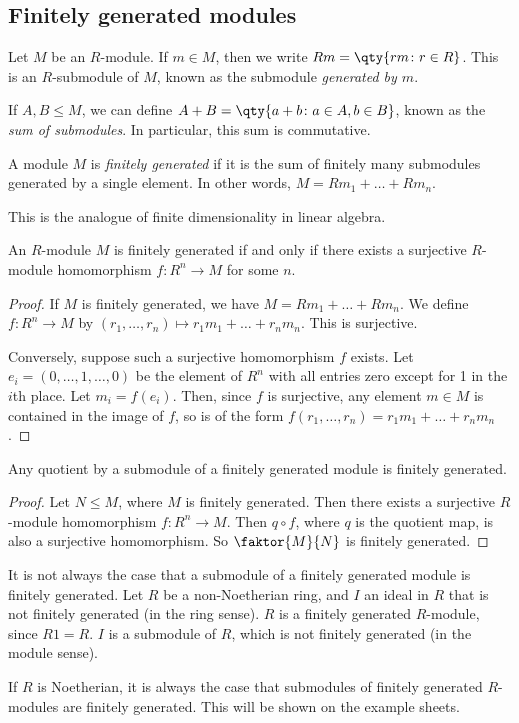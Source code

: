 \subsection{Finitely generated modules}
\begin{definition}
	Let $M$ be an $R$-module.
	If $m \in M$, then we write $Rm = \qty{rm \colon r \in R}$.
	This is an $R$-submodule of $M$, known as the submodule \textit{generated by $m$}.

	If $A, B \leq M$, we can define $A + B = \qty{a + b \colon a \in A, b \in B}$, known as the \textit{sum of submodules}.
	In particular, this sum is commutative.
\end{definition}
\begin{definition}
	A module $M$ is \textit{finitely generated} if it is the sum of finitely many submodules generated by a single element.
	In other words, $M = Rm_1 + \dots + Rm_n$.
\end{definition}
This is the analogue of finite dimensionality in linear algebra.
\begin{lemma}
	An $R$-module $M$ is finitely generated if and only if there exists a surjective $R$-module homomorphism $f \colon R^n \to M$ for some $n$.
\end{lemma}
\begin{proof}
	If $M$ is finitely generated, we have $M = Rm_1 + \dots + Rm_n$.
	We define $f \colon R^n \to M$ by $(r_1, \dots, r_n) \mapsto r_1 m_1 + \dots + r_n m_n$.
	This is surjective.

	Conversely, suppose such a surjective homomorphism $f$ exists.
	Let $e_i = (0, \dots, 1, \dots, 0)$ be the element of $R^n$ with all entries zero except for 1 in the $i$th place.
	Let $m_i = f(e_i)$.
	Then, since $f$ is surjective, any element $m \in M$ is contained in the image of $f$, so is of the form $f(r_1, \dots, r_n) = r_1 m_1 + \dots + r_n m_n$.
\end{proof}
\begin{corollary}
	Any quotient by a submodule of a finitely generated module is finitely generated.
\end{corollary}
\begin{proof}
	Let $N \leq M$, where $M$ is finitely generated.
	Then there exists a surjective $R$-module homomorphism $f \colon R^n \to M$.
	Then $q \circ f$, where $q$ is the quotient map, is also a surjective homomorphism.
	So $\faktor{M}{N}$ is finitely generated.
\end{proof}
\begin{example}
	It is not always the case that a submodule of a finitely generated module is finitely generated.
	Let $R$ be a non-Noetherian ring, and $I$ an ideal in $R$ that is not finitely generated (in the ring sense).
	$R$ is a finitely generated $R$-module, since $R1 = R$.
	$I$ is a submodule of $R$, which is not finitely generated (in the module sense).
\end{example}
\begin{remark}
	If $R$ is Noetherian, it is always the case that submodules of finitely generated $R$-modules are finitely generated.
	This will be shown on the example sheets.
\end{remark}

